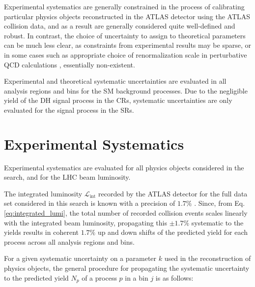 Experimental systematics are generally constrained in the process of calibrating particular physics objects reconstructed in the ATLAS detector using the ATLAS collision data, and as a result are generally considered quite well-defined and robust. In contrast, the choice of uncertainty to assign to theoretical parameters can be much less clear, as constraints from experimental results may be sparse, or in some cases such as appropriate choice of renormalization scale in perturbative QCD calculations \cite{PDG_2018}, essentially non-existent. 

Experimental and theoretical systematic uncertainties are evaluated in all analysis regions and bins for the SM background processes. Due to the negligible yield of the DH signal process in the CRs, systematic uncertainties are only evaluated for the signal process in the SRs.

\section{Experimental Systematics}

Experimental systematics are evaluated for all physics objects considered in the search, and for the LHC beam luminosity. 

The integrated luminosity \(\mathcal{L}_\text{int}\) recorded by the ATLAS detector for the full data set considered in this search is known with a precision of \(1.7\%\) \cite{ATLAS-CONF-2019-021}. Since, from Eq. \ref{eq:integrated_lumi}, the total number of recorded collision events scales linearly with the integrated beam luminosity, propagating this \(\pm1.7\%\) systematic to the yields results in coherent \(1.7\%\) up and down shifts of the predicted yield for each process across all analysis regions and bins.

For a given systematic uncertainty on a parameter \(k\) used in the reconstruction of physics objects, the general procedure for propagating the systematic uncertainty to the predicted yield \(N_p\) of a process \(p\) in a bin \(j\) is as follows:


